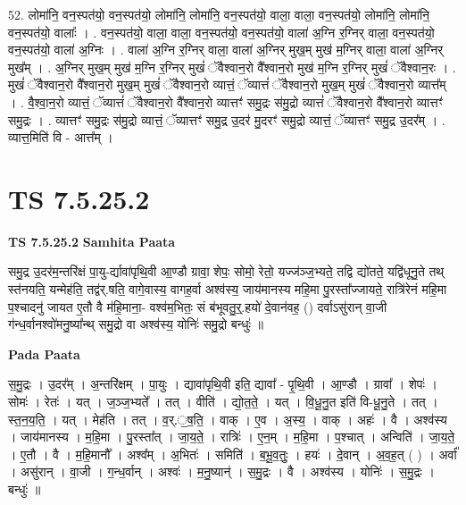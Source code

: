 \documentclass[17pt]{extarticle}
\begin{document}
52. लोमा॑नि॒ वन॒स्पत॑यो॒ वन॒स्पत॑यो॒ लोमा॑नि॒ लोमा॑नि॒ वन॒स्पत॑यो॒ वाला॒ वाला॒ वन॒स्पत॑यो॒ लोमा॑नि॒ लोमा॑नि॒ वन॒स्पत॑यो॒ वालाः᳚ । . वन॒स्पत॑यो॒ वाला॒ वाला॒ वन॒स्पत॑यो॒ वन॒स्पत॑यो॒ वाला॑ अ॒ग्नि र॒ग्निर् वाला॒ वन॒स्पत॑यो॒ वन॒स्पत॑यो॒ वाला॑ अ॒ग्निः । . वाला॑ अ॒ग्नि र॒ग्निर् वाला॒ वाला॑ अ॒ग्निर् मुख॒म् मुख॑ म॒ग्निर् वाला॒ वाला॑ अ॒ग्निर् मुख᳚म् । . अ॒ग्निर् मुख॒म् मुख॑ म॒ग्नि र॒ग्निर् मुखं॑ ॅवैश्वान॒रो वै᳚श्वान॒रो मुख॑ म॒ग्नि र॒ग्निर् मुखं॑ ॅवैश्वान॒रः । . मुखं॑ ॅवैश्वान॒रो वै᳚श्वान॒रो मुख॒म् मुखं॑ ॅवैश्वान॒रो व्यात्तं॒ ॅव्यात्तं॑ ॅवैश्वान॒रो मुख॒म् मुखं॑ ॅवैश्वान॒रो व्यात्त᳚म् । . वै॒श्वा॒न॒रो व्यात्तं॒ ॅव्यात्तं॑ ॅवैश्वान॒रो वै᳚श्वान॒रो व्यात्तꣳ॑ समु॒द्रः स॑मु॒द्रो व्यात्तं॑ ॅवैश्वान॒रो वै᳚श्वान॒रो व्यात्तꣳ॑ समु॒द्रः । . व्यात्तꣳ॑ समु॒द्रः स॑मु॒द्रो व्यात्तं॒ ॅव्यात्तꣳ॑ समु॒द्र उ॒दर॑ मु॒दरꣳ॑ समु॒द्रो व्यात्तं॒ ॅव्यात्तꣳ॑ समु॒द्र उ॒दर᳚म् । . व्यात्त॒मिति॑ वि - आत्त᳚म् । \newline
\pagebreak
{}

\section{ TS 7.5.25.2 }

\textbf{TS 7.5.25.2 } \newline
\textbf{Samhita Paata} \newline

समु॒द्र उ॒दर॑म॒न्तरि॑क्षं पा॒यु-र्द्यावा॑पृथि॒वी आ॒ण्डौ ग्रावा॒ शेपः॒ सोमो॒ रेतो॒ यज्ज॑ञ्ज॒भ्यते॒ तद्वि द्यो॑तते॒ यद्वि॑धूनु॒ते तथ् स्त॑नयति॒ यन्मेह॑ति॒ तद्व॑र्.षति॒ वागे॒वास्य॒ वागह॒र्वा अश्व॑स्य॒ जाय॑मानस्य महि॒मा पु॒रस्ता᳚ज्जायते॒ रात्रि॑रेनं महि॒मा प॒श्चादनु॑ जायत ए॒तौ वै म॑हि॒माना॒- वश्व॑म॒भितः॒ सं ब॑भूवतु॒र्॒.हयो॑ दे॒वान॑वह॒ () दर्वाऽसु॑रान् वा॒जी ग॑न्ध॒र्वानश्वो॑मनु॒ष्या᳚न्थ् समु॒द्रो वा अश्व॑स्य॒ योनिः॑ समु॒द्रो बन्धुः॑ ॥ \newline

\textbf{Pada Paata} \newline

स॒मु॒द्रः । उ॒दर᳚म् । अ॒न्तरि॑क्षम् । पा॒युः । द्यावा॑पृथि॒वी इति॒ द्यावा᳚ - पृ॒थि॒वी । आ॒ण्डौ । ग्रावा᳚ । शेपः॑ । सोमः॑ । रेतः॑ । यत् । ज॒ञ्ज॒भ्यते᳚ । तत् । वीति॑ । द्यो॒त॒ते॒ । यत् । वि॒धू॒नु॒त इति॑ वि-धू॒नु॒ते । तत् । स्त॒न॒य॒ति॒ । यत् । मेह॑ति । तत् । व॒र्.॒ष॒ति॒ । वाक् । ए॒व । अ॒स्य॒ । वाक् । अहः॑ । वै । अश्व॑स्य । जाय॑मानस्य । म॒हि॒मा । पु॒रस्ता᳚त् । जा॒य॒ते॒ । रात्रिः॑ । ए॒न॒म् । म॒हि॒मा । प॒श्चात् । अन्विति॑ । जा॒य॒ते॒ । ए॒तौ । वै । म॒हि॒मानौ᳚ । अश्व᳚म् । अ॒भितः॑ । समिति॑ । ब॒भू॒व॒तुः॒ । हयः॑ । दे॒वान् । अ॒व॒ह॒त् ( ) । अर्वा᳚ । असु॑रान् । वा॒जी । ग॒न्ध॒र्वान् । अश्वः॑ । म॒नु॒ष्यान्॑ । स॒मु॒द्रः । वै । अश्व॑स्य । योनिः॑ । स॒मु॒द्रः । बन्धुः॑ ॥  \newline
\end{document}
